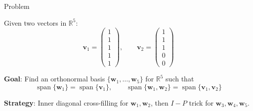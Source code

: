 \documentclass[10pt]{beamer}
\theoremstyle{definition}
\newcommand{\x}[1]{\alert{\textbf{#1}}}
\begin{document}
\begin{frame}{Problem}

Given two vectors in $\mathbb{R}^5$:
$$\mathbf{v}_1 = \begin{pmatrix} 1\\1\\1\\1\\1 \end{pmatrix}, \qquad \mathbf{v}_2 = \begin{pmatrix} 1\\1\\1\\0\\0 \end{pmatrix}$$

\vspace{0.3em}

\x{Goal}: Find an orthonormal basis $\{\mathbf{w}_1, \ldots, \mathbf{w}_5\}$ for $\mathbb{R}^5$ such that
$$\operatorname{span}\{\mathbf{w}_1\} = \operatorname{span}\{\mathbf{v}_1\}, \qquad \operatorname{span}\{\mathbf{w}_1, \mathbf{w}_2\} = \operatorname{span}\{\mathbf{v}_1, \mathbf{v}_2\}$$

\vspace{0.3em}

\textbf{Strategy}: Inner diagonal cross-filling for $\mathbf{w}_1, \mathbf{w}_2$, then $I - P$ trick for $\mathbf{w}_3, \mathbf{w}_4, \mathbf{w}_5$.

\end{frame}
\end{document}
